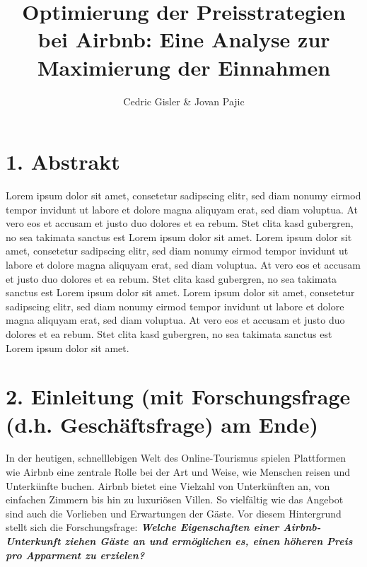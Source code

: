 \documentclass[
  journal,
]{IEEEtran}%
\title{Optimierung der Preisstrategien bei Airbnb: Eine Analyse zur
Maximierung der Einnahmen}
\author{
Cedric Gisler \& Jovan Pajic%

}
\begin{document}


\maketitle


%


\section{1. Abstrakt}\label{abstrakt}

Lorem ipsum dolor sit amet, consetetur sadipscing elitr, sed diam nonumy
eirmod tempor invidunt ut labore et dolore magna aliquyam erat, sed diam
voluptua. At vero eos et accusam et justo duo dolores et ea rebum. Stet
clita kasd gubergren, no sea takimata sanctus est Lorem ipsum dolor sit
amet. Lorem ipsum dolor sit amet, consetetur sadipscing elitr, sed diam
nonumy eirmod tempor invidunt ut labore et dolore magna aliquyam erat,
sed diam voluptua. At vero eos et accusam et justo duo dolores et ea
rebum. Stet clita kasd gubergren, no sea takimata sanctus est Lorem
ipsum dolor sit amet. Lorem ipsum dolor sit amet, consetetur sadipscing
elitr, sed diam nonumy eirmod tempor invidunt ut labore et dolore magna
aliquyam erat, sed diam voluptua. At vero eos et accusam et justo duo
dolores et ea rebum. Stet clita kasd gubergren, no sea takimata sanctus
est Lorem ipsum dolor sit amet.

\section{2. Einleitung (mit Forschungsfrage (d.h. Geschäftsfrage) am
Ende)}\label{einleitung-mit-forschungsfrage-d.h.-geschuxe4ftsfrage-am-ende}

In der heutigen, schnelllebigen Welt des Online-Tourismus spielen
Plattformen wie Airbnb eine zentrale Rolle bei der Art und Weise, wie
Menschen reisen und Unterkünfte buchen. Airbnb bietet eine Vielzahl von
Unterkünften an, von einfachen Zimmern bis hin zu luxuriösen Villen. So
vielfältig wie das Angebot sind auch die Vorlieben und Erwartungen der
Gäste. Vor diesem Hintergrund stellt sich die Forschungsfrage:
\textbf{\emph{Welche Eigenschaften einer Airbnb-Unterkunft ziehen Gäste
an und ermöglichen es, einen höheren Preis pro Apparment zu erzielen?}}
\end{document}
